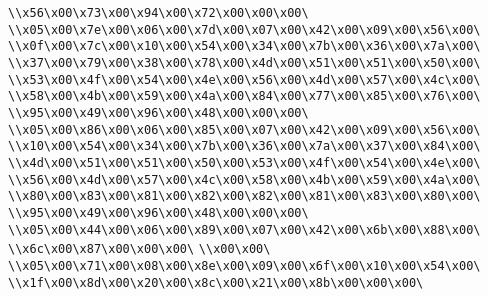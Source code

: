\verb|\\x56\x00\x73\x00\x94\x00\x72\x00\x00\x00\|\newline
\verb|\\x05\x00\x7e\x00\x06\x00\x7d\x00\x07\x00\x42\x00\x09\x00\x56\x00\|\newline
\verb|\\x0f\x00\x7c\x00\x10\x00\x54\x00\x34\x00\x7b\x00\x36\x00\x7a\x00\|\newline
\verb|\\x37\x00\x79\x00\x38\x00\x78\x00\x4d\x00\x51\x00\x51\x00\x50\x00\|\newline
\verb|\\x53\x00\x4f\x00\x54\x00\x4e\x00\x56\x00\x4d\x00\x57\x00\x4c\x00\|\newline
\verb|\\x58\x00\x4b\x00\x59\x00\x4a\x00\x84\x00\x77\x00\x85\x00\x76\x00\|\newline
\verb|\\x95\x00\x49\x00\x96\x00\x48\x00\x00\x00\|\newline
\verb|\\x05\x00\x86\x00\x06\x00\x85\x00\x07\x00\x42\x00\x09\x00\x56\x00\|\newline
\verb|\\x10\x00\x54\x00\x34\x00\x7b\x00\x36\x00\x7a\x00\x37\x00\x84\x00\|\newline
\verb|\\x4d\x00\x51\x00\x51\x00\x50\x00\x53\x00\x4f\x00\x54\x00\x4e\x00\|\newline
\verb|\\x56\x00\x4d\x00\x57\x00\x4c\x00\x58\x00\x4b\x00\x59\x00\x4a\x00\|\newline
\verb|\\x80\x00\x83\x00\x81\x00\x82\x00\x82\x00\x81\x00\x83\x00\x80\x00\|\newline
\verb|\\x95\x00\x49\x00\x96\x00\x48\x00\x00\x00\|\newline
\verb|\\x05\x00\x44\x00\x06\x00\x89\x00\x07\x00\x42\x00\x6b\x00\x88\x00\|\newline
\verb|\\x6c\x00\x87\x00\x00\x00\|\newline
\verb|\\x00\x00\|\newline
\verb|\\x05\x00\x71\x00\x08\x00\x8e\x00\x09\x00\x6f\x00\x10\x00\x54\x00\|\newline
\verb|\\x1f\x00\x8d\x00\x20\x00\x8c\x00\x21\x00\x8b\x00\x00\x00\|\newline
